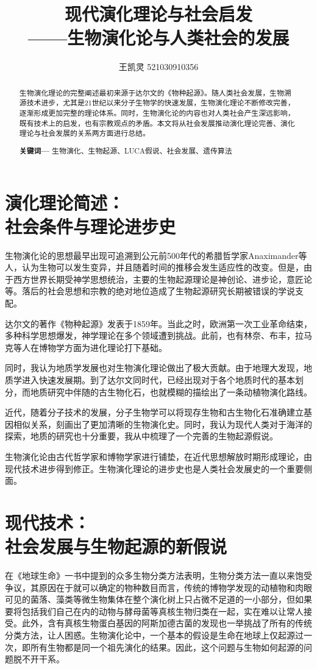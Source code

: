 \documentclass[a4paper]{IEEEtran}
\title{\huge{现代演化理论与社会启发}\\
	\Large{——生物演化论与人类社会的发展}
}
\author{王凯灵 521030910356}
\begin{document}
	\maketitle
	\begin{abstract}
		生物演化理论的完整阐述最初来源于达尔文的《物种起源》。随人类社会发展，生物溯源技术进步，尤其是21世纪以来分子生物学的快速发展，生物演化理论不断修改完善，逐渐形成更加完整的理论体系。同时，生物演化论的内容也对人类社会产生深远影响，既有技术上的启发，也有宗教观点的矛盾。本文将从社会发展推动演化理论完善、演化理论与社会发展的关系两方面进行总结。
	\par\textbf{关键词—}
		生物演化、生物起源、LUCA假说、社会发展、遗传算法
	\end{abstract}

	\section{演化理论简述：\\社会条件与理论进步史}
		生物演化论的思想最早出现可追溯到公元前500年代的希腊哲学家Anaximander等人\cite{nationalgeo}，认为生物可以发生变异，并且随着时间的推移会发生适应性的改变。但是，由于西方世界长期受神学思想统治，主要的生物起源理论是神创论、进步论，意匠论等。落后的社会思想和宗教的绝对地位造成了生物起源研究长期被错误的学说支配。
	
		达尔文的著作《物种起源》发表于1859年。当此之时，欧洲第一次工业革命结束，多种科学思想爆发，神学理论在多个领域遭到挑战。此前，也有林奈、布丰，拉马克等人在博物学方面为进化理论打下基础\cite{origin}。
		
		同时，我认为地质学发展也对生物演化理论做出了极大贡献。由于地理大发现，地质学进入快速发展期。到了达尔文同时代，已经出现对于各个地质时代的基本划分，而地质研究中伴随的古生物化石，也就模糊的描绘出了一条动植物演化路线。
		
		近代，随着分子技术的发展，分子生物学可以将现存生物和古生物化石准确建立基因相似关系，刻画出了更加清晰的生物演化史。同时，我认为现代人类对于海洋的探索，地质的研究也十分重要，我从中梳理了一个完善的生物起源假说。
		
		生物演化论由古代哲学家和博物学家进行铺垫，在近代思想解放时期形成理论，由现代技术进步得到修正。生物演化理论的进步史也是人类社会发展史的一个重要侧面。
		
		\section{现代技术：\\社会发展与生物起源的新假说}
			在《地球生命》\cite{chujianjun}一书中提到的众多生物分类方法表明，生物分类方法一直以来饱受争议，其原因在于就可以确定的物种数目而言，传统的博物学发现的动植物和肉眼可见的菌落、藻类等微生物集体在整个演化树上只占微不足道的一小部分，但如果要将包括我们自己在内的动物与酵母菌等真核生物归类在一起，实在难以让常人接受。此外，含有真核生物蛋白基因的阿斯加德古菌的发现也一举挑战了所有的传统分类方法，让人困惑。生物演化论中，一个基本的假设是生命在地球上仅起源过一次，即所有生物都是同一个祖先演化的结果。因此，这个问题与生物如何起源的问题脱不开干系。
			
\end{document}
